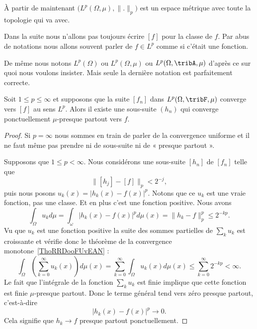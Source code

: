\begin{normaltext}
    À partir de maintenant \( \big( L^p(\Omega,\mu),\| . \|_p \big)\) est un espace métrique avec toute la topologie qui va avec.

    Dans la suite nous n'allons pas toujours écrire \( [f]\) pour la classe de \( f\). Par abus de notations nous allons souvent parler de \( f\in L^p\) comme si c'était une fonction.

    De même nous notons \( L^p(\Omega)\) ou \( L^p(\Omega,\mu)\) ou \( L^p(\Omega,\tribA,\mu)\) d'après ce sur quoi nous voulons insister. Mais seule la dernière notation est parfaitement correcte.
\end{normaltext}

\begin{proposition}  \label{PropWoywYG}
    Soit \( 1\leq p\leq \infty\) et supposons que la suite \( [f_n]\) dans \( L^p(\Omega,\tribF,\mu)\) converge vers \( [f]\) au sens \( L^p\). Alors il existe une sous-suite \( (h_n)\) qui converge ponctuellement \( \mu\)-presque partout vers \( f\).
\end{proposition}

\begin{proof}
    Si \( p=\infty\) nous sommes en train de parler de la convergence uniforme et il ne faut même pas prendre ni de sous-suite ni de « presque partout ».

    Supposons que \( 1\leq p<\infty\). Nous considérons une sous-suite \( [h_n]\) de \( [f_n]\) telle que
    \begin{equation}
        \| [h_j]-[f] \|_p<2^{-j},
    \end{equation}
    puis nous posons \( u_k(x)=| h_k(x)-f(x) |^p\). Notons que ce \( u_k\) est une vraie fonction, pas une classe. Et en plus c'est une fonction positive. Nous avons
    \begin{equation}
        \int_{\Omega}u_kd\mu=\int_{\omega}| h_k(x)-f(x) |^pd\mu(x)=\| h_k-f \|_p^p\leq 2^{-kp}.
    \end{equation}
    Vu que \( u_k\) est une fonction positive la suite des sommes partielles de \( \sum_ku_k\) est croissante et vérifie donc le théorème de la convergence monotone~\ref{ThoRRDooFUvEAN} :
    \begin{equation}
            \int_{\Omega}\left( \sum_{k=0}^{\infty}u_k(x) \right)d\mu(x)=\sum_{k=0}^{\infty}\int_{\Omega}u_k(x)d\mu(x)
            \leq\sum_{k=0}^{\infty}2^{-kp}<\infty.
    \end{equation}
    Le fait que l'intégrale de la fonction \( \sum_ku_k\) est finie implique que cette fonction est finie \( \mu\)-presque partout. Donc le terme général tend vers zéro presque partout, c'est-à-dire
    \begin{equation}
        | h_k(x)-f(x) |^p\to 0.
    \end{equation}
    Cela signifie que \( h_k\to f\) presque partout ponctuellement.
\end{proof}

